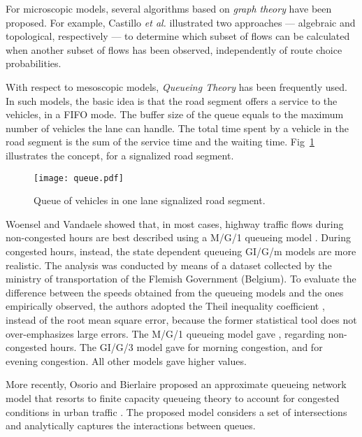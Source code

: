 \documentclass[10pt,onecolumn]{article}
\begin{document}
For microscopic models, several algorithms based on \textit{graph theory} have been proposed. For example, Castillo \textit{et al.} \cite{Castillo2008} illustrated two approaches --- algebraic and topological, respectively ---  to determine which subset of flows can be calculated when another subset of flows has been observed, independently of route choice probabilities.

With respect to mesoscopic models, \textit{Queueing Theory} has been frequently used. 
In such models, the basic idea is that the road segment offers a service to the vehicles, in a FIFO mode. The buffer size of the queue equals to the maximum number of vehicles the lane can handle.
The total time spent by a vehicle in the road segment is the sum of the service time and the waiting time. 
Fig~\ref{fig:queue} illustrates the concept, for a signalized road segment.

\begin{figure}[h]
\centering
\texttt{[image: queue.pdf]}
\caption{Queue of vehicles in one lane signalized road segment.}
\label{fig:queue}
\end{figure} 

Woensel and Vandaele showed that, in most cases, highway traffic flows during non-congested hours are best described using a M/G/1 queueing model \cite{Woensel2006}. 
During congested hours, instead, the state dependent queueing GI/G/m models are more realistic. 
The analysis was conducted by means of a dataset collected by the ministry of transportation of the Flemish Government (Belgium). To evaluate the difference between the speeds obtained from the queueing models and the ones empirically observed, the authors adopted the Theil inequality coefficient , instead of the root mean square error, because the former statistical tool does not over-emphasizes large errors. The M/G/1 queueing model gave , regarding non-congested hours. The GI/G/3 model gave  for morning congestion, and  for evening congestion. All other models gave higher  values.

More recently, Osorio and Bierlaire proposed an approximate queueing network model that resorts to finite capacity queueing theory to account for congested conditions in urban traffic \cite{Osorio2009}. The proposed model considers a set of intersections and analytically captures the interactions between queues. 
\end{document}
